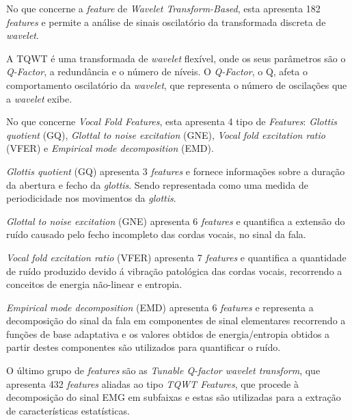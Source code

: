 \documentclass[12pt,a4paper,twoside]{report}
\begin{document}
{No que concerne a \textit{feature} de \textit{Wavelet Transform-Based}, esta apresenta 182 \textit{features} e permite a análise de sinais oscilatório da transformada discreta de \textit{wavelet}.

A \gls{TQWT} é uma transformada de \textit{wavelet} flexível, onde os seus parâmetros são o \textit{Q-Factor}, a redundância e o número de níveis. O \textit{Q-Factor}, o Q, afeta o comportamento oscilatório da \textit{wavelet}, que representa o número de oscilações que a \textit{wavelet} exibe. 


No que concerne \textit{Vocal Fold Features}, esta apresenta 4 tipo de \textit{Features}: \textit{Glottis quotient} (GQ), \textit{Glottal to noise excitation} (GNE), \textit{Vocal fold excitation ratio} (VFER) e \textit{Empirical mode decomposition} (EMD).

\textit{Glottis quotient} (GQ) apresenta 3 \textit{features} e fornece informações sobre a duração da abertura e fecho da \textit{glottis}. Sendo representada como uma medida de periodicidade nos movimentos da \textit{glottis}.


\textit{Glottal to noise excitation} (GNE) apresenta 6 \textit{features} e quantifica a extensão do ruído causado pelo fecho incompleto das cordas vocais, no sinal da fala.

\textit{Vocal fold excitation ratio} (VFER) apresenta 7 \textit{features} e quantifica a quantidade de ruído produzido devido á vibração patológica das cordas vocais, recorrendo a conceitos de energia não-linear e entropia.


\textit{Empirical mode decomposition} (EMD) apresenta 6 \textit{features} e representa a decomposição do sinal da fala em componentes de sinal elementares recorrendo a funções de base adaptativa e os valores obtidos de energia/entropia obtidos a partir destes componentes são utilizados para quantificar o ruído.

O último grupo de \textit{features} são as \textit{Tunable Q-factor wavelet transform}, que apresenta 432 \textit{features} aliadas ao tipo \textit{TQWT Features}, que procede à decomposição do sinal \gls{EMG} em subfaixas e estas são utilizadas para a extração de características estatísticas.


}
\end{document}
